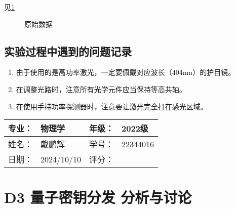 \documentclass[dvipsnames, svgnames,a4paper,11pt]{article}
\begin{document}
	见\cref{fig:data}

	\begin{figure}[htbp]
		\centering
		\quad
		\quad
		\newline
		\quad
		\caption{原始数据}
		\label{fig:data}
	\end{figure}
	





\clearpage
\subsection{实验过程中遇到的问题记录}

\begin{enumerate}
	\item 由于使用的是高功率激光，一定要佩戴对应波长（404nm）的护目镜。
	\item 在调整光路时，注意所有光学元件应当保持等高共轴。
	\item 在使用手持功率探测器时，注意要让激光完全打在感光区域。
	
\end{enumerate}
	

\clearpage
\begin{table}
	\renewcommand\arraystretch{1.7}
	\begin{tabularx}{\textwidth}{|X|X|X|X|}
	\hline
	专业：& 物理学 &年级：& 2022级\\
	\hline
	姓名： & 戴鹏辉 & 学号：& 22344016\\
	\hline
    日期：& 2024/10/10 & 评分： &\\
	\hline
	\end{tabularx}
\end{table}

\section{D3 \quad 量子密钥分发 \quad\heiti 分析与讨论}
\end{document}
